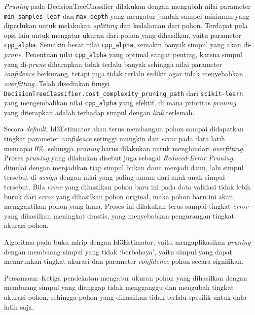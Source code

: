 \documentclass[11pt]{article}
\begin{document}
    \emph{Pruning} pada DecisionTreeClassifier dilakukan dengan mengubah
nilai parameter \texttt{min\_samples\_leaf} dan \texttt{max\_depth} yang
mengatur jumlah sampel minimum yang diperlukan untuk melakukan
\emph{splitting} dan kedalaman dari pohon. Terdapat pula opsi lain untuk
mengatur ukuran dari pohon yang dihasilkan, yaitu parameter
\texttt{cpp\_alpha}. Semakin besar nilai \texttt{cpp\_alpha}, semakin
banyak simpul yang akan di-\emph{prune}. Penentuan nilai
\texttt{cpp\_alpha} yang optimal sangat penting, karena simpul yang
di-\emph{prune} diharapkan tidak terlalu banyak sehingga nilai parameter
\emph{confidence} berkurang, tetapi juga tidak terlalu sedikit agar
tidak menyebabkan \emph{overfitting}. Telah disediakan fungsi
\texttt{DecisionTreeClassifier.cost\_complexity\_pruning\_path} dari
\texttt{scikit-learn} yang mengembalikan nilai \texttt{cpp\_alpha} yang
efektif, di mana prioritas \emph{pruning} yang diterapkan adalah
terhadap simpul dengan \emph{link} terlemah.

Secara \emph{default}, Id3Estimator akan terus membangun pohon sampai
didapatkan tingkat parameter \emph{confidence} setinggi mungkin dan
\emph{error} pada data latih mencapai 0\%, sehingga \emph{pruning} harus
dilakukan untuk menghindari \emph{overfitting}. Proses \emph{pruning}
yang dilakukan disebut juga sebagai \emph{Reduced-Error Pruning},
dimulai dengan menjadikan tiap simpul bukan daun menjadi daun, lalu
simpul tersebut di-\emph{assign} dengan nilai yang paling umum dari
anak-anak simpul tersebut. Bila \emph{error} yang dihasilkan pohon baru
ini pada data validasi tidak lebih buruk dari \emph{error} yang
dihasilkan pohon original, maka pohon baru ini akan menggantikan pohon
yang lama. Proses ini dilakukan terus sampai tingkat \emph{error} yang
dihasilkan meningkat drastis, yang menyebabkan pengurangan tingkat
akurasi pohon.

Algoritma pada buku mirip dengan Id3Estimator, yaitu mengaplikasikan
\emph{pruning} dengan membuang simpul yang tidak `berbahaya', yaitu
simpul yang dapat menurunkan tingkat akurasi dan parameter
\emph{confidence} pohon secara signifikan.

Persamaan: Ketiga pendekatan mengatur ukuran pohon yang dihasilkan
dengan membuang simpul yang dianggap tidak mengganggu dan mengubah
tingkat akurasi pohon, sehingga pohon yang dihasilkan tidak terlalu
spesifik untuk data latih saja.


    
    
    
    
\end{document}
